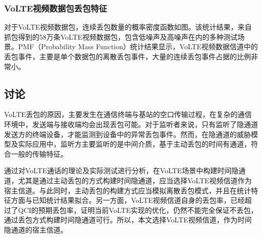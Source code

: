 \subsubsection{VoLTE视频数据包丢包特征}
\label{chap:backinfo:volte:packets:dropout}

对于VoLTE视频数据包，连续丢包数量的概率密度函数如图。该统计结果，来自抓包得到的58万条VoLTE视频数据包，包含低噪声及高噪声在内的多种测试场景。PMF（Probability Mass Function）统计结果显示，VoLTE视频数据信道中的丢包事件，主要是单个数据包的离散丢包事件，大量的连续丢包事件占据的比例非常小。

\subsection{讨论}
\label{chap:backinfo:volte:discuss}
VoLTE丢包的原因，主要发生在通信终端与基站的空口传输过程，在复杂的通信环境中，发送端与接收端均会出现丢包可能。对于监听者来说，只有监听了隐通道发送方的终端设备，才能监测到设备中的异常丢包事件。然而，在隐通道的威胁模型及实际应用中，监听方主要监听的是中间介质，基于主动丢包的时间有通道，符合一般的传输特征。

通过对VoLTE通话的理论及实际测试进行分析，在VoLTE场景中构建时间隐通道，尤其是通过主动丢包的方式构建时间隐通道，应当选择VoLTE视频信道作为宿主信道。与此同时，主动丢包的构建方式应当模拟离散丢包模式，并且在统计特征方面与已知统计结果拟合。另一方面，VoLTE视频信道自身的丢包率，已经超过了QCI的预期丢包率，证明当前VoLTE实现的优化，仍然不能完全保证不丢包，通过丢包方式构建时间隐通道可行。所以，本文选择VoLTE视频信道，作为时间隐通道的宿主信道。